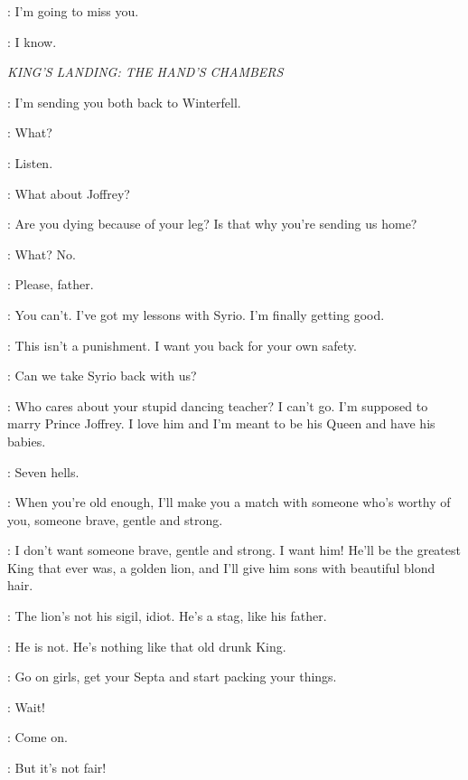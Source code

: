 
\THEON: I'm going to miss you. 

\ROS: I know. 


\scene

\textit{KING'S LANDING: THE HAND'S CHAMBERS} 


\NED: I'm sending you both back to Winterfell. 

\SANSA: What? 

\NED: Listen. 

\SANSA: What about Joffrey? 

\ARYA: Are you dying because of your leg? Is that why you're sending us home? 

\NED: What? No. 

\SANSA: Please, father. 

\ARYA: You can't. I've got my lessons with Syrio. I'm finally getting good. 

\NED: This isn't a punishment. I want you back for your own safety. 

\ARYA: Can we take Syrio back with us? 

\SANSA: Who cares about your stupid dancing teacher? I can't go. I'm supposed to marry Prince Joffrey. I love him and I'm meant to be his Queen and have his babies. 

\ARYA: Seven hells. 

\NED: When you're old enough, I'll make you a match with someone who's worthy of you, someone brave, gentle and strong.

\SANSA: I don't want someone brave, gentle and strong. I want him! He'll be the greatest King that ever was, a golden lion, and I'll give him sons with beautiful blond hair. 

\ARYA: The lion's not his sigil, idiot. He's a stag, like his father. 

\SANSA: He is not. He's nothing like that old drunk King. 

\NED:  Go on girls, get your Septa and start packing your things.

\SANSA: Wait! 

\ARYA: Come on.

\SANSA: But it's not fair! 


